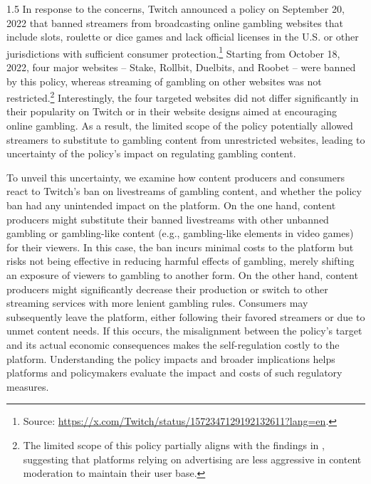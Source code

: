 \documentclass[a4paper,12pt]{article}
\begin{document}
\begin{spacing}{1.5}
In response to the concerns, Twitch announced a policy on September 20, 2022 that banned streamers from broadcasting online gambling websites that include slots, roulette or dice games and lack official licenses in the U.S. or other jurisdictions with sufficient consumer protection.\footnote{Source: \url{https://x.com/Twitch/status/1572347129192132611?lang=en}.} Starting from October 18, 2022, four major websites -- Stake, Rollbit, Duelbits, and Roobet -- were banned by this policy, whereas streaming of gambling on other websites was not restricted.\footnote{The limited scope of this policy partially aligns with the findings in \citet{liu2022implications}, suggesting that platforms relying on advertising are less aggressive in content moderation to maintain their user base.} Interestingly, the four targeted websites did not differ significantly in their popularity on Twitch or in their website designs aimed at encouraging online gambling. As a result, the limited scope of the policy potentially allowed streamers to substitute to gambling content from unrestricted websites, leading to uncertainty of the policy's impact on regulating gambling content. 


To unveil this uncertainty, we examine how content producers and consumers react to Twitch's ban on livestreams of gambling content, and whether the policy ban had any unintended impact on the platform. On the one hand, content producers might substitute their banned livestreams with other unbanned gambling or gambling-like content (e.g., gambling-like elements in video games) for their viewers. In this case, the ban incurs minimal costs to the platform but risks not being effective in reducing harmful effects of gambling, merely shifting an exposure of viewers to gambling to another form. On the other hand, content producers might significantly decrease their production or switch to other streaming services with more lenient gambling rules. Consumers may subsequently leave the platform, either following their favored streamers or due to unmet content needs. If this occurs, the misalignment between the policy's target and its actual economic consequences makes the self-regulation costly to the platform. Understanding the policy impacts and broader implications helps platforms and policymakers evaluate the impact and costs of such regulatory measures. 


\end{spacing}
\end{document}
